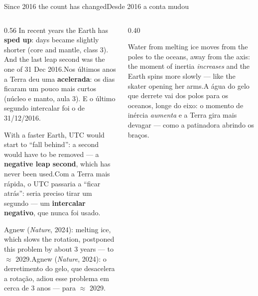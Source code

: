 \documentclass[aspectratio=169,11pt]{beamer}
\newcommand{\tr}[2]{\ifEN#2\else#1\fi}
\newcommand{\bnum}[1]{\textbf{\textcolor{mTeal}{#1}}}
\begin{document}
\begin{frame}{\tr{Desde 2016 a conta mudou}{Since 2016 the count has changed}}
  \begin{columns}[T]
    \begin{column}{0.56\textwidth}
      \small
      \tr{Nos últimos anos a Terra deu uma \bnum{acelerada}: os dias ficaram um pouco mais curtos (núcleo e manto, aula 3). E o último segundo intercalar foi o de 31/12/2016.}{In recent years the Earth has \bnum{sped up}: days became slightly shorter (core and mantle, class 3). And the last leap second was the one of 31 Dec 2016.}
      \medskip

      \tr{Com a Terra mais rápida, o UTC passaria a ``ficar atrás'': seria preciso tirar um segundo --- um \bnum{intercalar negativo}, que \alert{nunca} foi usado.}{With a faster Earth, UTC would start to ``fall behind'': a second would have to be removed --- a \bnum{negative leap second}, which has \alert{never} been used.}
      \medskip

      \tr{Agnew (\emph{Nature}, 2024): o derretimento do gelo, que desacelera a rotação, adiou esse problema em cerca de 3 anos --- para $\approx$ 2029.}{Agnew (\emph{Nature}, 2024): melting ice, which slows the rotation, postponed this problem by about 3 years --- to $\approx$ 2029.}
    \end{column}
    \begin{column}{0.40\textwidth}
      \begin{cuidado}[title={\tr{O clima mexe no relógio}{Climate moves the clock}}]
        \small\tr{A água do gelo que derrete vai dos polos para os oceanos, longe do eixo: o momento de inércia \emph{aumenta} e a Terra gira mais devagar --- como a patinadora abrindo os braços.}{Water from melting ice moves from the poles to the oceans, away from the axis: the moment of inertia \emph{increases} and the Earth spins more slowly --- like the skater opening her arms.}
      \end{cuidado}
    \end{column}
  \end{columns}
\end{frame}
\end{document}
